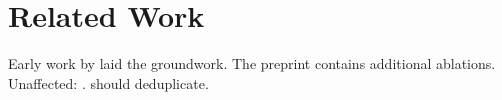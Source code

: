 \section{Related Work}

Early work by \citeauthor{lecun1989b} \citeyear{lecun1989b} laid the groundwork.
The preprint \citep[p.~3]{vaswani2017preprint} contains additional ablations.
Unaffected: \citep{hochreiter1997}.
\citep{vaswani2017preprint,vaswani2017} should deduplicate.
